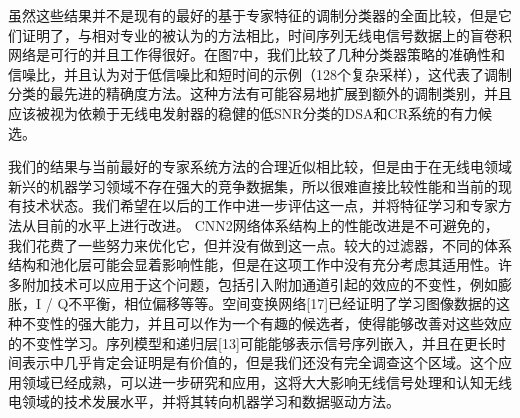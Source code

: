 虽然这些结果并不是现有的最好的基于专家特征的调制分类器的全面比较，但是它们证明了，与相对专业的被认为的方法相比，时间序列无线电信号数据上的盲卷积网络是可行的并且工作得很好。在图7中，我们比较了几种分类器策略的准确性和信噪比，并且认为对于低信噪比和短时间的示例（128个复杂采样），这代表了调制分类的最先进的精确度方法。这种方法有可能容易地扩展到额外的调制类别，并且应该被视为依赖于无线电发射器的稳健的低SNR分类的DSA和CR系统的有力候选。\par

我们的结果与当前最好的专家系统方法的合理近似相比较，但是由于在无线电领域新兴的机器学习领域不存在强大的竞争数据集，所以很难直接比较性能和当前的现有技术状态。我们希望在以后的工作中进一步评估这一点，并将特征学习和专家方法从目前的水平上进行改进。 CNN2网络体系结构上的性能改进是不可避免的，我们花费了一些努力来优化它，但并没有做到这一点。较大的过滤器，不同的体系结构和池化层可能会显着影响性能，但是在这项工作中没有充分考虑其适用性。许多附加技术可以应用于这个问题，包括引入附加通道引起的效应的不变性，例如膨胀，I / Q不平衡，相位偏移等等。空间变换网络[17]已经证明了学习图像数据的这种不变性的强大能力，并且可以作为一个有趣的候选者，使得能够改善对这些效应的不变性学习。序列模型和递归层[13]可能能够表示信号序列嵌入，并且在更长时间表示中几乎肯定会证明是有价值的，但是我们还没有完全调查这个区域。这个应用领域已经成熟，可以进一步研究和应用，这将大大影响无线信号处理和认知无线电领域的技术发展水平，并将其转向机器学习和数据驱动方法。\par

